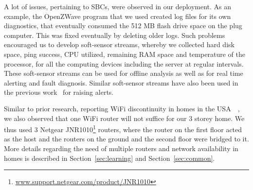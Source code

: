 \documentclass[10pt]{sensys-proc}
\newcommand{\figref}[1]{Figure~\ref{#1}}
\newcommand{\secref}[1]{Section~\ref{#1}}
\newcommand{\paradigm}{Sense-Local Store-Upload}
\begin{document}



A lot of issues, pertaining to SBCs, were observed in our deployment. As an example, the OpenZWave program that we used created log files for its own diagnostics, that eventually consumed the 512 MB flash drive space on the plug computer. This was fixed eventually by deleting older logs. Such problems encouraged us to develop soft-sensor streams, whereby we collected hard disk space, ping success, CPU utilized, remaining RAM space and temperature of the processor, for all the computing devices including the server at regular intervals. These soft-sensor streams can be used for offline analysis as well as for real time alerting and fault diagnosis. Similar soft-sensor streams have also been used in the previous work~\cite{hitchhiker_residential} for raising alerts.

Similar to prior research, reporting WiFi discontinuity in homes in the USA~~\cite{hitchhiker_residential}, we also observed that one WiFi router will not suffice for our 3 storey home. We thus used 3 Netgear JNR1010\footnote{\url{www.support.netgear.com/product/JNR1010}} routers, where the router on the first floor acted as the host and the routers on the ground and the second floor were bridged to it. More details regarding the need of multiple routers and network availability in homes is described in \secref{sec:learning} and \secref{sec:common}.
\end{document}
